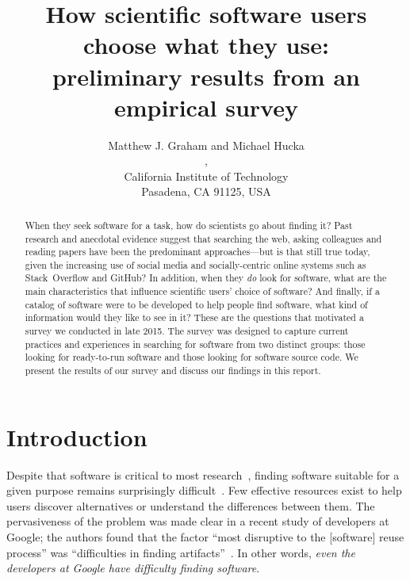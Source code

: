 \documentclass{casicswhitepaper}
\begin{document}
\title{How scientific software users choose what they use:\\
preliminary results from an empirical survey}
\date{\dateAndVersion}
\author{Matthew J. Graham and Michael Hucka\\
,\quad{}\\
California Institute of Technology\\
Pasadena, CA 91125, USA}
\maketitle

\begin{abstract}
When they seek software for a task, how do scientists go about finding it?  Past research and anecdotal evidence suggest that searching the web, asking colleagues and reading papers have been the predominant approaches---but is that still true today, given the increasing use of social media and socially-centric online systems such as Stack~Overflow and GitHub?  In addition, when they \emph{do} look for software, what are the main characteristics that influence scientific users' choice of software?  And finally, if a catalog of software were to be developed to help people find software, what kind of information would they like to see in it?  These are the questions that motivated a survey we conducted in late 2015.  The survey was designed to capture current practices and experiences in searching for software from two distinct groups: those looking for ready-to-run software and those looking for software source code.  We present the results of our survey and discuss our findings in this report.
\end{abstract}


\section{Introduction}

Despite that software is critical to most research~\citep{bauer2014exploratory, hettrick_2014, hannay_2009, baxter_2006, wilson_2006}, finding software suitable for a given purpose remains surprisingly difficult~\cite{cannata_2005, Bourne::2015, SoftwareDiscoveryIndex:2014}.  Few effective resources exist to help users discover alternatives or understand the differences between them.  The pervasiveness of the problem was made clear in a recent study of developers at Google; the authors found that the factor ``most disruptive to the [software] reuse process'' was ``difficulties in finding artifacts''~\cite{bauer2014exploratory}.  In other words, \emph{even the developers at Google have difficulty finding software}.
\end{document}
